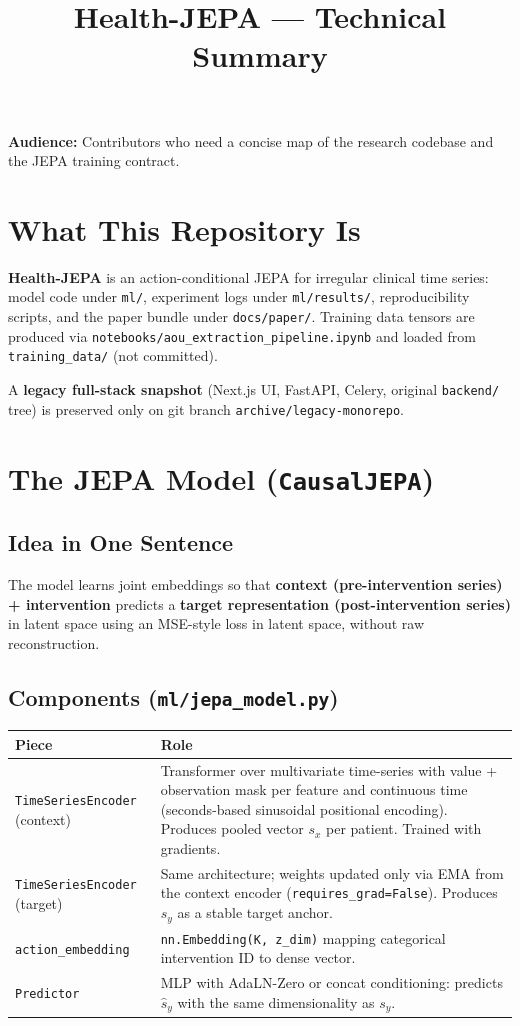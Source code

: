 \documentclass[11pt]{article}
\title{Health-JEPA --- Technical Summary}
\author{}
\date{}
\begin{document}
\maketitle

\noindent\textbf{Audience:} Contributors who need a concise map of the research codebase and the JEPA training contract.

\section{What This Repository Is}

\textbf{Health-JEPA} is an action-conditional JEPA for irregular clinical time series: model code under \texttt{ml/}, experiment logs under \texttt{ml/results/}, reproducibility scripts, and the paper bundle under \texttt{docs/paper/}.
Training data tensors are produced via \texttt{notebooks/aou\_extraction\_pipeline.ipynb} and loaded from \texttt{training\_data/} (not committed).

\noindent A \textbf{legacy full-stack snapshot} (Next.js UI, FastAPI, Celery, original \texttt{backend/} tree) is preserved only on git branch \texttt{archive/legacy-monorepo}.

\section{The JEPA Model (\texttt{CausalJEPA})}

\subsection{Idea in One Sentence}
The model learns joint embeddings so that \textbf{context (pre-intervention series) + intervention} predicts a \textbf{target representation (post-intervention series)} in latent space using an MSE-style loss in latent space, without raw reconstruction.

\subsection{Components (\texttt{ml/jepa\_model.py})}

\begin{longtable}{p{} p{}}
\toprule
\textbf{Piece} & \textbf{Role} \\
\midrule
\texttt{TimeSeriesEncoder} (context) &
Transformer over multivariate time-series with value + observation mask per feature and continuous time (seconds-based sinusoidal positional encoding). Produces pooled vector $s_x$ per patient. Trained with gradients. \\
\texttt{TimeSeriesEncoder} (target) &
Same architecture; weights updated only via EMA from the context encoder (\texttt{requires\_grad=False}). Produces $s_y$ as a stable target anchor. \\
\texttt{action\_embedding} &
\texttt{nn.Embedding(K, z\_dim)} mapping categorical intervention ID to dense vector. \\
\texttt{Predictor} &
MLP with AdaLN-Zero or concat conditioning: predicts $\hat{s}_y$ with the same dimensionality as $s_y$. \\
\bottomrule
\end{longtable}
\end{document}
